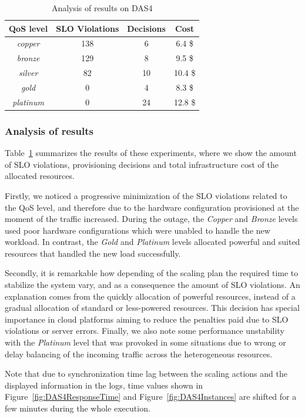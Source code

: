 \begin{table}
  {\scriptsize 
\begin{center}
    \begin{tabular}{  | c | c | c | c  |}
    \hline
         \textbf{QoS level}  & \textbf{SLO Violations} & \textbf{Decisions}  & \textbf{Cost}   \\ \hline
   \textit{copper}   & 138  &  6 &  6.4 \$ \\ \hline   
   \textit{bronze}  &  129 &   8&  9.5 \$  \\ \hline   
   \textit{silver}  &  82  & 10  &  10.4 \$  \\ \hline   
   \textit{gold}  & 0  &  4  &   8.3 \$    \\ \hline   
\textit{platinum} &  0 & 24 & 12.8 \$  \\ \hline   

 \end{tabular}
\end{center}
\vspace{-3mm}
\caption{Analysis of results on DAS4}
\label{summaryDAS4}
}
\end{table}

\subsubsection{Analysis of results}

Table~\ref{summaryDAS4} summarizes the results of these experiments, where we show the amount of SLO violations, provisioning decisions and total infrastructure cost of the allocated resources. 

Firstly, we noticed a progressive minimization of the SLO violations related to the QoS level, and therefore due to the hardware configuration provisioned at the moment of the traffic increased. During the outage, the \emph{Copper} and \emph{Bronze} levels used poor hardware configurations which were unabled to handle the new workload. In contrast, the \emph{Gold}  and \emph{Platinum} levels allocated powerful and suited resources that handled the new load successfully.

Secondly, it is remarkable how depending of the scaling plan the required time to stabilize the system vary, and as a consequence the amount of SLO violations. An explanation comes from the quickly allocation of powerful resources, instead of a gradual allocation of standard or less-powered resources. This decision has special importance in cloud platforms aiming to reduce the penalties paid due to SLO violations or server errors. Finally, we also note some performance unstability with the \emph{Platinum} level that was provoked in some situations due to wrong or delay balancing of the incoming traffic across the heterogeneous resources.

Note that due to synchronization time lag between the scaling actions and the displayed information in the logs, time values shown in Figure~\ref{fig:DAS4ResponseTime} and Figure~\ref{fig:DAS4Instances} are shifted for a few minutes during the whole execution.

